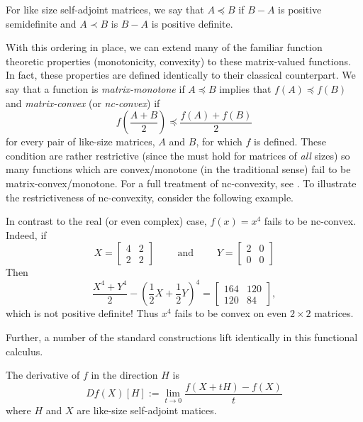 \begin{definition}
\label{def:LoewnerOrder}
  For like size self-adjoint matrices, we say that \(A \preceq B\) if \(B - A \)
  is positive semidefinite and \(A \prec B\) is \(B-A\) is positive definite.
\end{definition}

With this ordering in place, we can extend many of the familiar function
theoretic properties (monotonicity, convexity) to these matrix-valued functions.
In fact, these properties are defined identically to their classical counterpart.
We say that a function is \emph{matrix-monotone} if \(A \preceq B\) implies that
\(f(A) \preceq f(B)\) and \emph{matrix-convex} (or \emph{nc-convex}) if
\[
  f \left( \frac{A+B}{2} \right) \preceq \frac{f(A)+f(B)}{2}
\]
for every pair of like-size matrices, \(A\) and \(B\), for which \(f\) is defined. These condition
are rather restrictive (since the must hold for matrices of \emph{all} sizes) so
many functions which are convex/monotone (in the traditional sense) fail to be
matrix-convex/monotone. For a full treatment of nc-convexity, see
\cite{heltonFree2013}. To illustrate the restrictiveness of nc-convexity,
consider the following example.
\begin{example}%
\label{ex:helton1}
  In contrast to the real (or even complex) case, \(f(x)=x^4\) fails to be nc-convex.
  Indeed, if
  \[
    X = \begin{bmatrix} 4 &2\\2&2 \end{bmatrix}  \qquad \text{ and } \qquad Y =\begin{bmatrix} 2&0\\0&0 \end{bmatrix}
  \]
  Then
  \[
    \frac{X^4+Y^4}{2} - \left( \frac{1}{2}X +\frac{1}{2}Y \right) ^4
    = \begin{bmatrix} 164 &120\\120&84 \end{bmatrix},
  \]
  which is not positive definite! Thus \(x^4\) fails to be convex on even
  \(2\times 2\) matrices.
\end{example}

Further, a number of the standard constructions lift identically in this
functional calculus.
\begin{definition}
  \label{def:DirDeriv}
  The derivative of \(f\) in the direction \(H\) is
  \[
    Df(X)[H] := \lim_{t \to 0} \frac{f(X+tH) - f(X)}{t}
  \]
  where \(H\) and \(X\) are like-size self-adjoint matices.
\end{definition}


